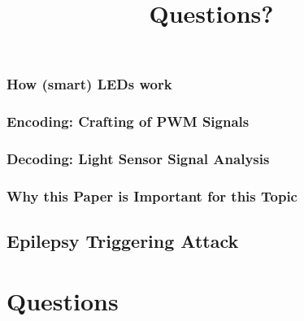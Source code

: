 \documentclass[11pt,t,usepdftitle=false,aspectratio=169]{beamer}
\begin{document}
\subsubsection{How (smart) LEDs work}%
\label{sub:how_smart_leds_work}

\subsubsection{Encoding: Crafting of PWM Signals}%
\label{sub:encoding_crafting_of_pwm_signals}


\subsubsection{Decoding: Light Sensor Signal Analysis}%
\label{sub:decoding_light_sensor_signal_analysis}

\subsubsection{Why this Paper is Important for this Topic}%
\label{sub:why_this_paper_is_important_for_this_topic}


\subsection{Epilepsy Triggering Attack}%
\label{sub:epilepsy_triggering_attack}

\title{Questions?}
\subtitle{}
\section{Questions}


\appendix
\end{document}
